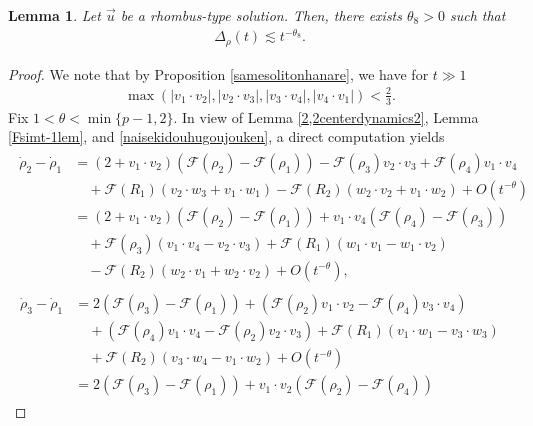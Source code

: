 \documentclass[10pt,a4paper]{amsart}
\newtheorem{lemma}[theorem]{Lemma}
\numberwithin{equation}{section}
\begin{document}
\begin{lemma}\label{henchourhomblem}
Let $\vec{u}$ be a rhombus-type solution. Then, there exists $\theta_8>0$ such that 
\begin{align}\label{deltarhoes}
\Delta_{\rho}(t)\lesssim t^{-\theta_8}.
\end{align}
\end{lemma}
\begin{proof}
We note that by Proposition \ref{samesolitonhanare}, we have for $t\gg 1$
\begin{align}\label{naisekidouhugoujouken}
\max{(|v_1\cdot v_2|,|v_2\cdot v_3|, |v_3\cdot v_4|, |v_4\cdot v_1|)}<\frac{2}{3}.
\end{align}
Fix $1<\theta<\min\{p-1,2\}$. In view of  Lemma \ref{2,2centerdynamics2}, Lemma \ref{Fsimt-1lem}, and
\eqref{naisekidouhugoujouken}, a direct computation yields
\begin{align}\label{rho2-rho1es1}
\begin{aligned}
\dot{\rho}_2-\dot{\rho}_1&=\left(2+v_1\cdot v_2\right)\left(\mathcal{F}(\rho_2)-\mathcal{F}(\rho_1)\right)-\mathcal{F}(\rho_3)v_2\cdot v_3+\mathcal{F}(\rho_4)v_1\cdot v_4
\\
&\quad+\mathcal{F}(R_1)\left(v_2\cdot w_3+v_1\cdot w_1\right)-\mathcal{F}(R_2)\left(w_2\cdot v_2+v_1\cdot w_2\right)+O\left(t^{-\theta}\right)
\\
&=\left(2+v_1\cdot v_2\right)\left(\mathcal{F}(\rho_2)-\mathcal{F}(\rho_1)\right)+v_1\cdot v_4\left(\mathcal{F}(\rho_4)-\mathcal{F}(\rho_3)\right)
\\
&\quad+\mathcal{F}(\rho_3)(v_1\cdot v_4-v_2\cdot v_3)+\mathcal{F}(R_1)\left(w_1\cdot v_1-w_1\cdot v_2\right)
\\
&\quad -\mathcal{F}(R_2)\left(w_2\cdot v_1+w_2\cdot v_2\right)+O\left(t^{-\theta}\right),
\end{aligned}
\end{align}
\begin{align}\label{rho3-rho1es1}
\begin{aligned}
\dot{\rho}_3-\dot{\rho}_1&=2\left(\mathcal{F}(\rho_3)-\mathcal{F}(\rho_1)\right)+\left(\mathcal{F}(\rho_2)v_1\cdot v_2-\mathcal{F}(\rho_4)v_3\cdot v_4\right)
\\
&\quad+\left(\mathcal{F}(\rho_4)v_1\cdot v_4-\mathcal{F}(\rho_2)v_2\cdot v_3\right)+\mathcal{F}(R_1)\left(v_1\cdot w_1-v_3\cdot w_3\right)
\\
&\quad +\mathcal{F}(R_2)\left(v_3\cdot w_4-v_1\cdot w_2\right)+O\left(t^{-\theta}\right)
\\
&=2\left(\mathcal{F}(\rho_3)-\mathcal{F}(\rho_1)\right)+v_1\cdot v_2\left(\mathcal{F}(\rho_2)-\mathcal{F}(\rho_4)\right)

\end{aligned}
\end{align}
\end{proof}
\end{document}
